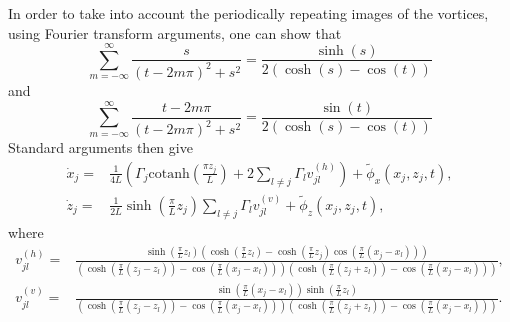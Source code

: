 \documentclass[a4paper,11pt]{article}
\begin{document}
In order to take into account the periodically repeating images of the vortices, using Fourier transform arguments, one can show that 
\[
\sum_{m=-\infty}^{\infty}\frac{s}{(t-2m\pi)^{2}+s^{2}} = \frac{\sinh(s)}{2(\cosh(s)-\cos(t))}
\]
and
\[
\sum_{m=-\infty}^{\infty}\frac{t-2m\pi}{(t-2m\pi)^{2}+s^{2}} = \frac{\sin(t)}{2(\cosh(s)-\cos(t))}
\]
Standard arguments then give 
\begin{align*}
\dot{x}_{j} = & \frac{1}{4L}\left(  \Gamma_{j}\mbox{cotanh}\left(\frac{\pi z_{j}}{L} \right)+2\sum_{l\neq j}\Gamma_{l}v_{jl}^{(h)} \right)+ \tilde{\phi}_{x}(x_{j},z_{j},t),\\
\dot{z}_{j} = & \frac{1}{2L}\sinh\left(\frac{\pi}{L}z_{j}\right)\sum_{l\neq j} \Gamma_{l} v_{jl}^{(v)} + \tilde{\phi}_{z}(x_{j},z_{j},t),
\end{align*}
where
\begin{align*}
v_{jl}^{(h)} = & \frac{\sinh\left(\frac{\pi}{L}z_{l}\right)\left(\cosh(\frac{\pi}{L}z_{l})-\cosh(\frac{\pi}{L}z_{j})\cos\left(\frac{\pi}{L}(x_{j}-x_{l})\right)\right)}{\left(\cosh\left(\frac{\pi}{L}(z_{j}-z_{l})\right)-\cos\left(\frac{\pi}{L}(x_{j}-x_{l})\right)\right)\left(\cosh\left(\frac{\pi}{L}(z_{j}+z_{l})\right)-\cos\left(\frac{\pi }{L}(x_{j}-x_{l})\right)\right)}, \\
v_{jl}^{(v)} = & \frac{\sin\left(\frac{\pi}{L}(x_{j}-x_{l})\right)\sinh\left(\frac{\pi}{L}z_{l}\right)}{\left(\cosh\left(\frac{\pi}{L}(z_{j}-z_{l})\right)-\cos\left(\frac{\pi}{L}(x_{j}-x_{l})\right)\right)\left(\cosh\left(\frac{\pi}{L}(z_{j}+z_{l})\right)-\cos\left(\frac{\pi }{L}(x_{j}-x_{l})\right)\right)}.
\end{align*}
\end{document}
